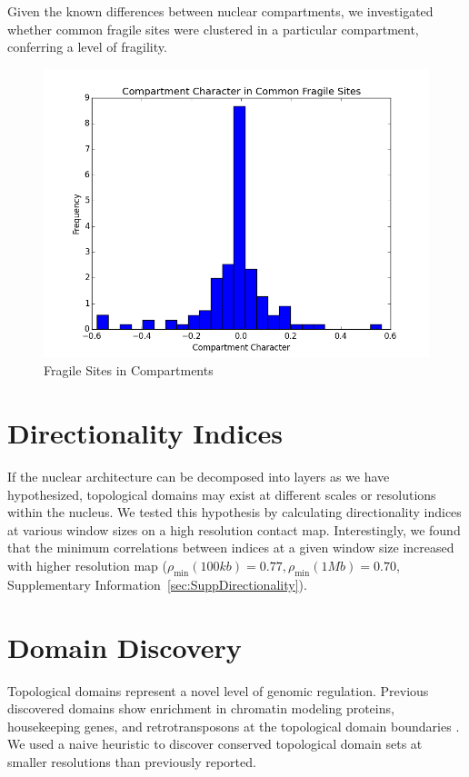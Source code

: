 Given the known differences between nuclear compartments, we investigated whether common fragile sites were clustered in a particular
compartment, conferring a level of fragility. 

\begin{figure}[thp]
  \centering
  \caption{Fragile Sites in Compartments}\label{fig:compartmentCfs}
  \includegraphics[width=\textwidth]{./figures/results/cfs.png}
\end{figure}


\section*{Directionality Indices}

If the nuclear architecture can be decomposed into layers as we have hypothesized, topological domains may exist at different
scales or resolutions within the nucleus.  We tested this hypothesis by calculating directionality indices at various window sizes
on a high resolution contact map.  Interestingly, we found that the minimum correlations between indices at a given window size increased
with higher resolution map ($\rho_{\min}(100kb) = 0.77, \rho_{\min}(1Mb) = 0.70$, Supplementary Information~\ref{sec:SuppDirectionality}).

\section*{Domain Discovery}

Topological domains represent a novel level of genomic regulation.  Previous discovered domains show enrichment in chromatin modeling proteins,
housekeeping genes, and retrotransposons at the topological domain boundaries \citep{dixon2012}.  We used a naive heuristic to discover conserved
topological domain sets at smaller resolutions than previously reported.

